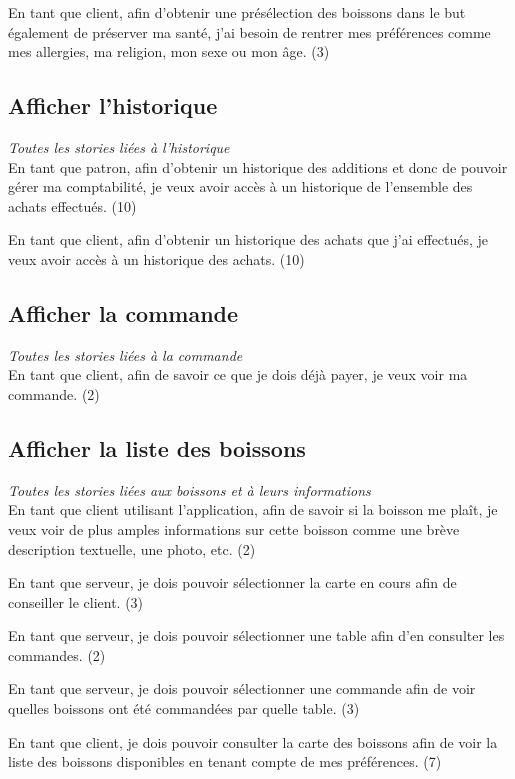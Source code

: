 \documentclass[10pt, a4, oneside, headings=normal]{scrartcl}
\begin{document}
En tant que client, afin d'obtenir une présélection des boissons dans le but également de préserver ma santé, j'ai besoin de rentrer mes préférences comme mes allergies, ma religion, mon sexe ou mon âge.  (3)

\subsection{Afficher l'historique}
\emph{Toutes les stories liées à l'historique} 
\\

En tant que patron, afin d'obtenir un historique des additions et donc de pouvoir gérer ma comptabilité, je veux avoir accès à un historique de l'ensemble des achats effectués. (10)

En tant que client, afin d'obtenir un historique des achats que j'ai effectués, je veux avoir accès à un historique des achats. (10)

\subsection{Afficher la commande}
\emph{Toutes les stories liées à la commande}
\\

En tant que client, afin de savoir ce que je dois déjà payer, je veux voir ma commande. (2)

\subsection{Afficher la liste des boissons}
\emph{Toutes les stories liées aux boissons et à leurs informations}
\\

En tant que client utilisant l'application, afin de savoir si la boisson me plaît, je veux voir de plus amples informations sur cette boisson comme une brève description textuelle, une photo, etc. (2)

En tant que serveur, je dois pouvoir sélectionner la carte en cours afin de conseiller le client. (3)

En tant que serveur, je dois pouvoir sélectionner une table afin d'en consulter les commandes. (2)

En tant que serveur, je dois pouvoir sélectionner une commande afin de voir quelles boissons ont été commandées par quelle table. (3)

En tant que client, je dois pouvoir consulter la carte des boissons afin de voir la liste des boissons disponibles en tenant compte de mes préférences. (7)
\end{document}
